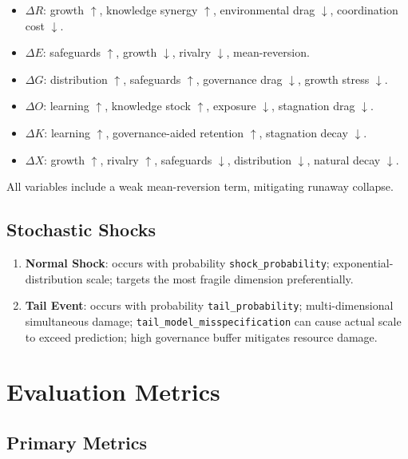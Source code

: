 \begin{itemize}
\item $\Delta R$: growth $\uparrow$, knowledge synergy $\uparrow$,
environmental drag $\downarrow$, coordination cost $\downarrow$.
\item $\Delta E$: safeguards $\uparrow$, growth $\downarrow$,
rivalry $\downarrow$, mean-reversion.
\item $\Delta G$: distribution $\uparrow$, safeguards $\uparrow$,
governance drag $\downarrow$, growth stress $\downarrow$.
\item $\Delta O$: learning $\uparrow$, knowledge stock $\uparrow$,
exposure $\downarrow$, stagnation drag $\downarrow$.
\item $\Delta K$: learning $\uparrow$, governance-aided retention
$\uparrow$, stagnation decay $\downarrow$.
\item $\Delta X$: growth $\uparrow$, rivalry $\uparrow$, safeguards
$\downarrow$, distribution $\downarrow$, natural decay
$\downarrow$.
\end{itemize}

All variables include a weak mean-reversion term, mitigating runaway
collapse.

\subsection{Stochastic Shocks}
\label{sec:vnext-stochastic-shocks}

\begin{enumerate}
\item \textbf{Normal Shock}: occurs with probability
\texttt{shock\_probability}; exponential-distribution scale; targets
the most fragile dimension preferentially.
\item \textbf{Tail Event}: occurs with probability
\texttt{tail\_probability}; multi-dimensional simultaneous damage;
\texttt{tail\_model\_misspecification} can cause actual scale to
exceed prediction; high governance buffer mitigates resource
damage.
\end{enumerate}

\section{Evaluation Metrics}
\label{sec:vnext-metrics}

\subsection{Primary Metrics}
\label{sec:vnext-primary-metrics}


